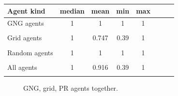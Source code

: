 \begin{center} 
  \begin{tabular}{l*{6}{c}r}
  Agent kind        & median & mean & min & max \\
  \hline
  GNG agents        & 1 & 1 & 1 & 1  \\
                    &   \\
  Grid agents       & 1                     & 0.747                 & 0.39                & 1  \\  
                    & \color{green}{+0.39}  & \color{green}{0.026}  & \color{red}{-0.08}  \\
  Random agents     & 1 & 1 & 1 & 1  \\         
                    & \\
  All agents        & 1 & 0.916                 & 0.39 & 1  \\  
                    &   & \color{green}{+0.092}  & \color{red}{-0.05} \\
  \end{tabular}                                        
\end{center}



\begin{figure}[h!]
  \centering      
  \caption{GNG, grid, PR agents together.}
\end{figure} 
              
